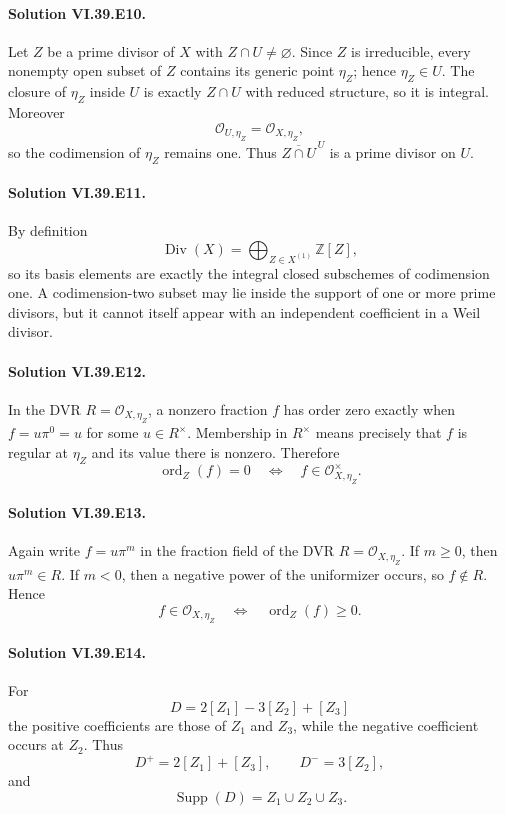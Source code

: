\paragraph{Solution VI.39.E10.}\label{sol:vi39-e10}
Let \(Z\) be a prime divisor of \(X\) with \(Z\cap U\ne\varnothing\).  Since \(Z\) is irreducible, every nonempty open subset of \(Z\) contains its generic point \(\eta_Z\); hence \(\eta_Z\in U\).  The closure of \(\eta_Z\) inside \(U\) is exactly \(Z\cap U\) with reduced structure, so it is integral.  Moreover
\[
 \mathcal O_{U,\eta_Z}=\mathcal O_{X,\eta_Z},
\]
so the codimension of \(\eta_Z\) remains one.  Thus \(\overline{Z\cap U}^{\,U}\) is a prime divisor on \(U\).

\paragraph{Solution VI.39.E11.}\label{sol:vi39-e11}
By definition
\[
 \operatorname{Div}(X)=\bigoplus_{Z\in X^{(1)}}\mathbb Z[Z],
\]
so its basis elements are exactly the integral closed subschemes of codimension one.  A codimension-two subset may lie inside the support of one or more prime divisors, but it cannot itself appear with an independent coefficient in a Weil divisor.

\paragraph{Solution VI.39.E12.}\label{sol:vi39-e12}
In the DVR \(R=\mathcal O_{X,\eta_Z}\), a nonzero fraction \(f\) has order zero exactly when \(f=u\pi^0=u\) for some \(u\in R^\times\).  Membership in \(R^\times\) means precisely that \(f\) is regular at \(\eta_Z\) and its value there is nonzero.  Therefore
\[
 \operatorname{ord}_Z(f)=0
 \quad\Longleftrightarrow\quad
 f\in\mathcal O_{X,\eta_Z}^{\times}.
\]

\paragraph{Solution VI.39.E13.}\label{sol:vi39-e13}
Again write \(f=u\pi^m\) in the fraction field of the DVR \(R=\mathcal O_{X,\eta_Z}\).  If \(m\ge0\), then \(u\pi^m\in R\).  If \(m<0\), then a negative power of the uniformizer occurs, so \(f\notin R\).  Hence
\[
 f\in\mathcal O_{X,\eta_Z}
 \quad\Longleftrightarrow\quad
 \operatorname{ord}_Z(f)\ge0.
\]

\paragraph{Solution VI.39.E14.}\label{sol:vi39-e14}
For
\[
 D=2[Z_1]-3[Z_2]+[Z_3]
\]
the positive coefficients are those of \(Z_1\) and \(Z_3\), while the negative coefficient occurs at \(Z_2\).  Thus
\[
 D^+=2[Z_1]+[Z_3],\qquad D^-=3[Z_2],
\]
and
\[
 \operatorname{Supp}(D)=Z_1\cup Z_2\cup Z_3.
\]

